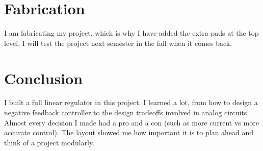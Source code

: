 \documentclass[10pt]{amsart}
\begin{document}
\section{Fabrication}

I am fabricating my project, which is why I have added the extra pads at the top level. I will test the project next semester in the fall when it comes back.

\section{Conclusion}

I built a full linear regulator in this project. I learned a lot, from how to design a negative feedback controller to the design tradeoffs involved in analog circuits. Almost every decision I made had a pro and a con (such as more current vs more accurate control). The layout showed me how important it is to plan ahead and think of a project modularly.
\end{document}

